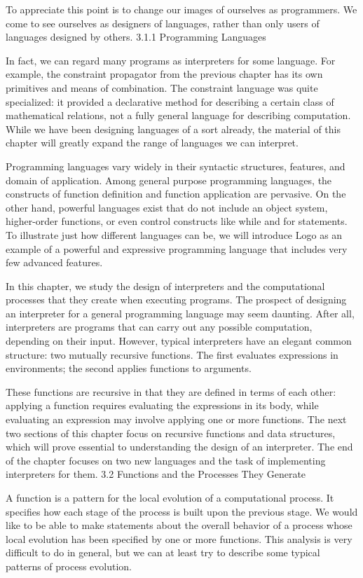 \documentclass[letterpaper,10pt,dvipdfmx]{sphinxmanual}
\begin{document}
To appreciate this point is to change our images of ourselves as programmers. We come to see ourselves as designers of languages, rather than only users of languages designed by others.
3.1.1   Programming Languages

In fact, we can regard many programs as interpreters for some language. For example, the constraint propagator from the previous chapter has its own primitives and means of combination. The constraint language was quite specialized: it provided a declarative method for describing a certain class of mathematical relations, not a fully general language for describing computation. While we have been designing languages of a sort already, the material of this chapter will greatly expand the range of languages we can interpret.

Programming languages vary widely in their syntactic structures, features, and domain of application. Among general purpose programming languages, the constructs of function definition and function application are pervasive. On the other hand, powerful languages exist that do not include an object system, higher-order functions, or even control constructs like while and for statements. To illustrate just how different languages can be, we will introduce Logo as an example of a powerful and expressive programming language that includes very few advanced features.

In this chapter, we study the design of interpreters and the computational processes that they create when executing programs. The prospect of designing an interpreter for a general programming language may seem daunting. After all, interpreters are programs that can carry out any possible computation, depending on their input. However, typical interpreters have an elegant common structure: two mutually recursive functions. The first evaluates expressions in environments; the second applies functions to arguments.

These functions are recursive in that they are defined in terms of each other: applying a function requires evaluating the expressions in its body, while evaluating an expression may involve applying one or more functions. The next two sections of this chapter focus on recursive functions and data structures, which will prove essential to understanding the design of an interpreter. The end of the chapter focuses on two new languages and the task of implementing interpreters for them.
3.2   Functions and the Processes They Generate

A function is a pattern for the local evolution of a computational process. It specifies how each stage of the process is built upon the previous stage. We would like to be able to make statements about the overall behavior of a process whose local evolution has been specified by one or more functions. This analysis is very difficult to do in general, but we can at least try to describe some typical patterns of process evolution.
\end{document}
